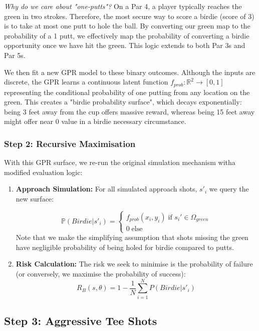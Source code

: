 \documentclass[11pt, letterpaper]{article}
\begin{document}
\textit{Why do we care about "one-putts"?} On a Par 4, a player typically reaches the green in two strokes. Therefore, the most secure way to score a birdie (score of 3) is to take at most one putt to hole the ball. By converting our green map to the probability of a 1 putt, we effectively map the probability of converting a birdie opportunity once we have hit the green. This logic extends to both Par 3s and Par 5s.

We then fit a new GPR model to these binary outcomes. Although the inputs are discrete, the GPR learns a continuous latent function $f_{prob}: \mathbb{R}^2 \to [0,1] $ representing the conditional probability of one putting from any location on the green. This creates a "birdie probability surface", which decays exponentially: being 3 feet away from the cup offers massive reward, whereas being 15 feet away might offer near 0 value in a birdie necessary circumstance.

\subsubsection{Step 2: Recursive Maximisation}
With this GPR surface, we re-run the original simulation mechanism witha modified evaluation logic:

\begin{enumerate}
    \item \textbf{Approach Simulation:} For all simulated approach shots, $s'_i$ we query the new surface:

    \[
    \mathbb{P}(Birdie|s'_i) = \begin{cases}
        f_{prob}(x_i, y_i) \; \text{if } s_i' \in \Omega_{green} \\
        0 \; \text{else}
    \end{cases}
    \]
Note that we make the simplifying assumption that shots missing the green have negligible probability of being holed for birdie compared to putts.

    \item \textbf{Risk Calculation:} The risk we seek to minimise is the probability of failure (or conversely, we maximise the probability of success):
$$R_{B}(s, \theta) = 1 - \frac{1}{N} \sum_{i=1}^{N} P(Birdie | s'_i)$$
\end{enumerate}

\subsection{Step 3: Aggressive Tee Shots}
\end{document}

